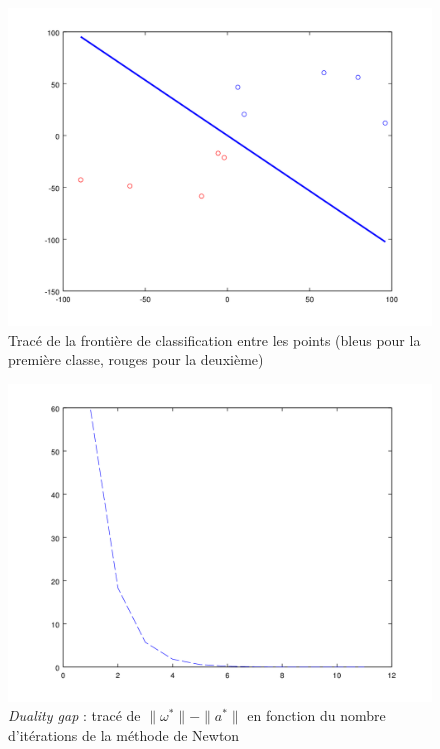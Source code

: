 \documentclass{beamer}
\begin{document}
\begin{frame}
         \begin{figure}
           \begin{center}
             \subfigure\includegraphics[scale=0.5]{images/line2D1.png}
             \caption{Tracé de la frontière de classification entre les points (bleus pour la première classe, rouges pour la deuxième)}
           \end{center}
         \end{figure}

         \begin{figure}
           \begin{center}
             \subfigure\includegraphics[scale=0.5]{images/dualitygap1.png}
             \caption{\emph{Duality gap} : tracé de $\|\omega^*\| - \|a^*\|$ en fonction du nombre d'itérations de la méthode de Newton}
           \end{center}
         \end{figure}


\end{frame}
\end{document}
